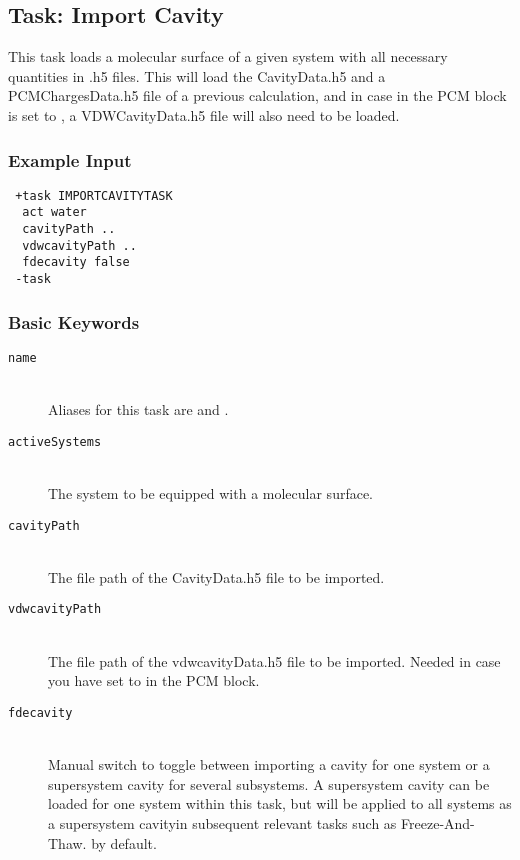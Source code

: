 \subsection{Task: Import Cavity}\label{sec:tasks:ImportCavityTask}
This task loads a molecular surface of a given system with all necessary quantities in .h5 files.
This will load the CavityData.h5 and a PCMChargesData.h5 file of a previous calculation, and in case  in the PCM block is set to , a VDWCavityData.h5 file will also need to be loaded.
\subsubsection{Example Input}
\begin{lstlisting}
 +task IMPORTCAVITYTASK
  act water
  cavityPath ..
  vdwcavityPath ..
  fdecavity false
 -task
\end{lstlisting}

\subsubsection{Basic Keywords}
\begin{description}
\item [\texttt{name}]\hfill \\
  Aliases for this task are  and .
\item [\texttt{activeSystems}]\hfill \\
  The system to be equipped with a molecular surface.
\item [\texttt{cavityPath}]\hfill \\
  The file path of the CavityData.h5 file to be imported.
\item [\texttt{vdwcavityPath}]\hfill \\
  The file path of the vdwcavityData.h5 file to be imported. Needed in case you have  set to  in the PCM block.
\item [\texttt{fdecavity}]\hfill \\
  Manual switch to toggle between importing a cavity for one system or a supersystem cavity for several subsystems. A supersystem cavity can be loaded for one system within this task, but will be applied to all systems as a supersystem cavityin subsequent relevant tasks such as Freeze-And-Thaw.  by default.
\end{description}
